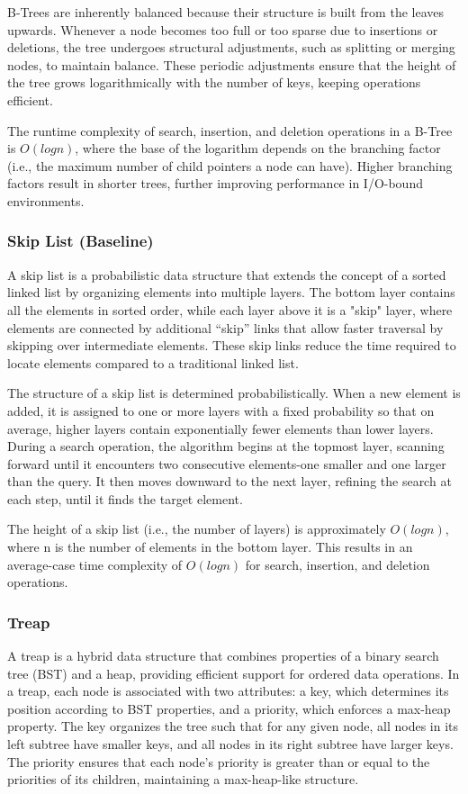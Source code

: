 \documentclass[sigconf]{acmart}
\begin{document}
B-Trees are inherently balanced because their structure is built from the leaves upwards. Whenever a node becomes too full or too sparse due to insertions or deletions, the tree undergoes structural adjustments, such as splitting or merging nodes, to maintain balance. These periodic adjustments ensure that the height of the tree grows logarithmically with the number of keys, keeping operations efficient.

The runtime complexity of search, insertion, and deletion operations in a B-Tree is $O(logn)$, where the base of the logarithm depends on the branching factor (i.e., the maximum number of child pointers a node can have). Higher branching factors result in shorter trees, further improving performance in I/O-bound environments.

\subsubsection{Skip List (Baseline)}
A skip list\cite{skiplist_ds} is a probabilistic data structure that extends the concept of a sorted linked list by organizing elements into multiple layers. The bottom layer contains all the elements in sorted order, while each layer above it is a "skip" layer, where elements are connected by additional “skip” links that allow faster traversal by skipping over intermediate elements. These skip links reduce the time required to locate elements compared to a traditional linked list.

The structure of a skip list is determined probabilistically. When a new element is added, it is assigned to one or more layers with a fixed probability so that on average, higher layers contain exponentially fewer elements than lower layers. During a search operation, the algorithm begins at the topmost layer, scanning forward until it encounters two consecutive elements-one smaller and one larger than the query. It then moves downward to the next layer, refining the search at each step, until it finds the target element.

The height of a skip list (i.e., the number of layers) is approximately $O(logn)$, where n is the number of elements in the bottom layer. This results in an average-case time complexity of $O(logn)$ for search, insertion, and deletion operations.

\subsubsection{Treap}
A treap\cite{treap_ds} is a hybrid data structure that combines properties of a binary search tree (BST) and a heap, providing efficient support for ordered data operations. In a treap, each node is associated with two attributes: a key, which determines its position according to BST properties, and a priority, which enforces a max-heap property. The key organizes the tree such that for any given node, all nodes in its left subtree have smaller keys, and all nodes in its right subtree have larger keys. The priority ensures that each node's priority is greater than or equal to the priorities of its children, maintaining a max-heap-like structure.
\end{document}

